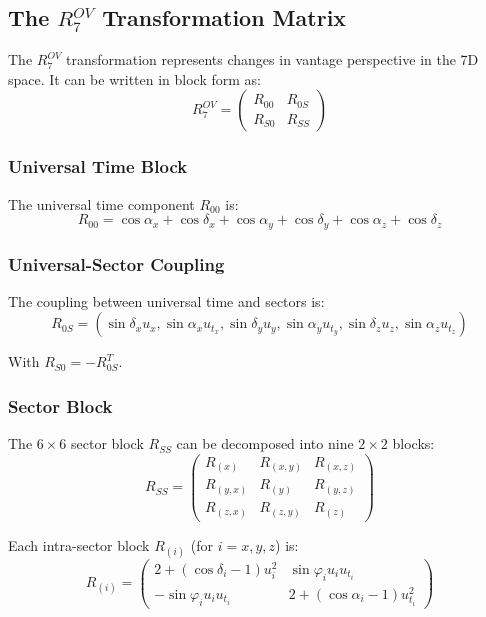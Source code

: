 \documentclass{article}
\begin{document}
\subsection{The $R^{OV}_7$ Transformation Matrix}

The $R^{OV}_7$ transformation represents changes in vantage perspective in the 7D space. It can be written in block form as:
\begin{equation}
R^{OV}_7 = \begin{pmatrix} 
R_{00} & R_{0S} \\
R_{S0} & R_{SS}
\end{pmatrix}
\end{equation}

\subsubsection{Universal Time Block}
The universal time component $R_{00}$ is:
\begin{equation}
R_{00} = \cos\alpha_x + \cos\delta_x + \cos\alpha_y + \cos\delta_y + \cos\alpha_z + \cos\delta_z
\end{equation}

\subsubsection{Universal-Sector Coupling}
The coupling between universal time and sectors is:
\begin{equation}
R_{0S} = (\sin\delta_x u_x, \sin\alpha_x u_{t_x}, \sin\delta_y u_y, \sin\alpha_y u_{t_y}, \sin\delta_z u_z, \sin\alpha_z u_{t_z})
\end{equation}

With $R_{S0} = -R_{0S}^T$.

\subsubsection{Sector Block}
The $6 \times 6$ sector block $R_{SS}$ can be decomposed into nine $2 \times 2$ blocks:
\begin{equation}
R_{SS} = \begin{pmatrix}
R_{(x)} & R_{(x,y)} & R_{(x,z)} \\
R_{(y,x)} & R_{(y)} & R_{(y,z)} \\
R_{(z,x)} & R_{(z,y)} & R_{(z)}
\end{pmatrix}
\end{equation}

Each intra-sector block $R_{(i)}$ (for $i = x, y, z$) is:
\begin{equation}
R_{(i)} = \begin{pmatrix}
2+(\cos\delta_i-1)u_i^2 & \sin\varphi_i u_i u_{t_i} \\
-\sin\varphi_i u_i u_{t_i} & 2+(\cos\alpha_i-1)u_{t_i}^2
\end{pmatrix}
\end{equation}
\end{document}
